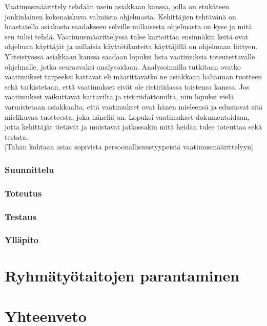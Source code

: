 \documentclass[finnish]{../tktltiki2}
\theoremstyle{definition}
\theoremstyle{remark}
\begin{document}
Vaatimusmäärittely tehdään usein asiakkaan kanssa, jolla on etukäteen jonkinlainen kokonaiskuva valmiista ohjelmasta.
Kehittäjien tehtävänä on haastatella asiakasta saadakseen selville millaisesta ohjelmasta on kyse ja mitä sen tulisi tehdä.
Vaatimusmäärittelyssä tulee kartoittaa ensinnäkin keitä ovat ohjelman käyttäjät ja millaisia käyttötilanteita
käyttäjillä on ohjelmaan liittyen. Yhteistyössä asiakkaan kanssa saadaan lopuksi lista vaatimuksia toteutettavalle ohjelmalle,
jotka seuraavaksi analysoidaan. Analysoinnilla tutkitaan ovatko vaatimukset tarpeeksi kattavat eli määrittävätkö ne asiakkaan
haluaman tuotteen sekä tarkistetaan, että vaatimukset eivät ole ristiriidassa toistensa kanssa. Jos vaatimukset vaikuttavat
kattavilta ja ristiriidattomilta, niin lopuksi vielä varmistetaan asiakkaalta, että vaatimukset ovat hänen mieleensä ja
edustavat sitä mielikuvaa tuotteesta, joka hänellä on.
Lopuksi vaatimukset dokumentoidaan, jotta kehittäjät tietävät ja muistavat jatkossakin mitä heidän tulee toteuttaa sekä testata.\\

[Tähän kohtaan asiaa sopivista persoonallisuustyypeistä vaatimusmäärittelyyn]

\subsubsection{Suunnittelu}
\subsubsection{Toteutus}
\subsubsection{Testaus}
\subsubsection{Ylläpito}

\section{Ryhmätyötaitojen parantaminen}

\section{Yhteenveto}


%
%
% 
%



\end{document}
